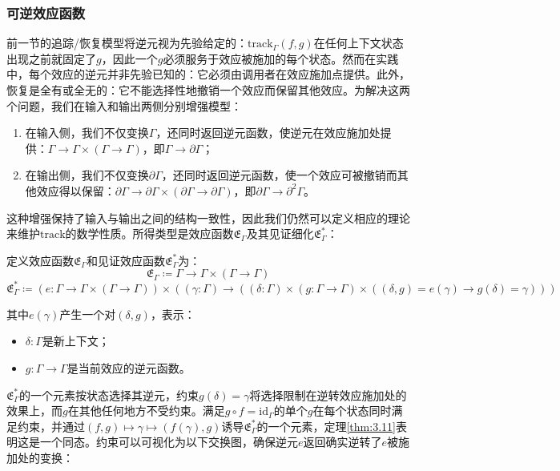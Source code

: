 \subsubsection{可逆效应函数}\label{subsubsec:3.1.2}

前一节的追踪/恢复模型将逆元视为先验给定的：$\mathrm{track}_\Gamma(f, g)$在任何上下文状态出现之前就固定了$g$，因此一个$g$必须服务于效应被施加的每个状态。然而在实践中，每个效应的逆元并非先验已知的：它必须由调用者在效应施加点提供。此外，恢复是全有或全无的：它不能选择性地撤销一个效应而保留其他效应。为解决这两个问题，我们在输入和输出两侧分别增强模型：
\begin{enumerate}
\item 在输入侧，我们不仅变换$\Gamma$，还同时返回逆元函数，使逆元在效应施加处提供：$\Gamma \to \Gamma \times (\Gamma \to \Gamma)$，即$\Gamma \to \partial\Gamma$；
\item 在输出侧，我们不仅变换$\partial\Gamma$，还同时返回逆元函数，使一个效应可被撤销而其他效应得以保留：$\partial\Gamma \to \partial\Gamma \times (\partial\Gamma \to \partial\Gamma)$，即$\partial\Gamma \to \partial^2\Gamma$。
\end{enumerate}

这种增强保持了输入与输出之间的结构一致性，因此我们仍然可以定义相应的理论来维护$\mathrm{track}$的数学性质。所得类型是效应函数$\mathfrak{E}_\Gamma$及其见证细化$\mathfrak{E}^*_\Gamma$：

\begin{definition}\label{def:3.8}
定义效应函数$\mathfrak{E}_\Gamma$和见证效应函数$\mathfrak{E}^*_\Gamma$为：
\begin{equation}\label{eq:3.12}
\mathfrak{E}_\Gamma \coloneqq \Gamma \to \Gamma \times (\Gamma \to \Gamma)
\end{equation}
\[
\mathfrak{E}^*_\Gamma \coloneqq (e: \Gamma \to \Gamma \times (\Gamma \to \Gamma)) \times ((\gamma: \Gamma) \to ((\delta: \Gamma) \times (g: \Gamma \to \Gamma) \times ((\delta, g) = e(\gamma) \to g(\delta) = \gamma)))
\]
\end{definition}

其中$e(\gamma)$产生一个对$(\delta, g)$，表示：
\begin{itemize}
\item $\delta: \Gamma$是新上下文；
\item $g: \Gamma \to \Gamma$是当前效应的逆元函数。
\end{itemize}

$\mathfrak{E}^*_\Gamma$的一个元素按状态选择其逆元，约束$g(\delta) = \gamma$将选择限制在逆转效应施加处的效果上，而$g$在其他任何地方不受约束。满足$g \circ f = \mathrm{id}_\Gamma$的单个$g$在每个状态同时满足约束，并通过$(f, g) \mapsto \gamma \mapsto (f(\gamma), g)$诱导$\mathfrak{E}^*_\Gamma$的一个元素，定理\ref{thm:3.11}表明这是一个同态。约束可以可视化为以下交换图，确保逆元$e$返回确实逆转了$e$被施加处的变换：

